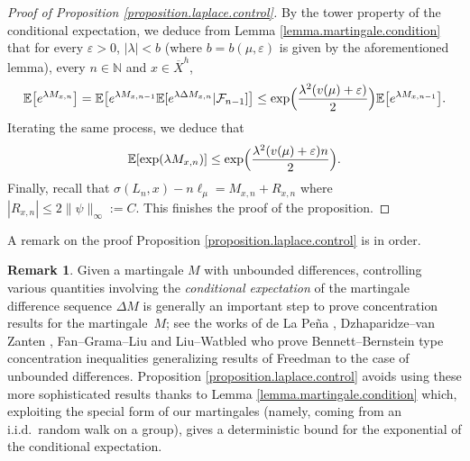 \documentclass[JEP,XML,SOM,Unicode,published]{cedram}
\let\epsilon\varepsilon
\theoremstyle{plain}
\theoremstyle{definition}
\newtheorem{remark}[theorem]{Remark}
\newcommand\E{\mathbb{E}}
\newcommand\N{\mathbb{N}}
\begin{document}
\begin{proof}[Proof of Proposition \ref{proposition.laplace.control}]
By the tower property of the conditional expectation, we deduce from Lemma \ref{lemma.martingale.condition} that for every $\epsilon>0$, $|\lambda|<b$ (where $b=b(\mu,\epsilon)$ is given by the aforementioned lemma), every $n\in \N$ and $x\in \overline{X}^h$,
\[
\E\bigl[e^{\lambda M_{x,n}}\bigr]
= \E\bigl[e^{\lambda M_{x,n-1}} \E[e^{\lambda \Delta M_{x,n}} |\mathcal{F}_{n-1}]\bigr]
\leq \exp\Bigl(\frac{\lambda^2(v(\mu)+\epsilon)}{2}\Bigr) \E\bigl[e^{\lambda M_{x,n-1}}\bigr].
\]
Iterating the same process, we deduce that
\[
\E[\exp(\lambda M_{x,n})]\leq \exp\Bigl(\frac{ \lambda^2 (v(\mu)+\epsilon) n}{2}\Bigr).
\]
Finally, recall that $\sigma(L_n,x)-n\ell_\mu=M_{x,n}+R_{x,n}$ where $|R_{x,n}|\leq 2\|\psi\|_{\infty}:=C$. This finishes the proof of the proposition.
\end{proof}

A remark on the proof Proposition \ref{proposition.laplace.control} is in order.

\begin{remark}
Given a martingale $M$ with unbounded differences, controlling various quantities involving the \emph{conditional expectation} of the martingale difference sequence $\Delta M$ is generally an important step to prove concentration results for the martingale~$M$; see the works of de La Pe\~{n}a \cite{de.la.pena}, Dzhaparidze--van Zanten \cite{DZ}, Fan--Grama--Liu \cite{fan.grama.liu} and Liu--Watbled \cite{liu-watbled} who prove Bennett--Bernstein type concentration inequalities generalizing results of Freedman \cite{Freedman} to the case of unbounded differences. Proposition \ref{proposition.laplace.control} avoids using these more sophisticated results thanks to Lemma \ref{lemma.martingale.condition} which, exploiting the special form of our martingales (namely, coming from an i.i.d.\ random walk on a group), gives a deterministic bound for the exponential of the conditional expectation.
\end{remark}
\end{document}
